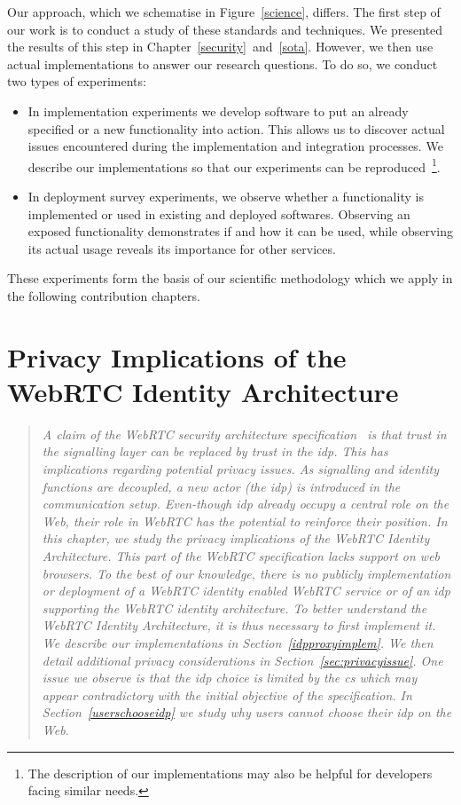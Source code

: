 Our approach, which we schematise in Figure~\ref{science}, differs.
The first step of our work is to conduct a study of these standards and techniques.
We presented the results of this step in Chapter~\ref{security}~and~\ref{sota}.
However, we then use actual implementations to answer our research questions. 
To do so, we conduct two types of experiments:
\begin{itemize}
\item In implementation experiments we develop software to put an already specified or a new functionality into action.
This allows us to discover actual issues encountered during the implementation and integration processes.
We describe our implementations so that our experiments can be reproduced~\footnote{The description of our implementations may also be helpful for developers facing similar needs.}.
\item In deployment survey experiments, we observe whether a functionality is implemented or used in existing and deployed softwares.
Observing an exposed functionality demonstrates if and how it can be used, while observing its actual usage reveals its importance for other services.
\end{itemize}

These experiments form the basis of our scientific methodology which we apply in the following contribution chapters.



\chapter{Privacy Implications of the WebRTC Identity Architecture}
\label{webrtcprivacy}
\begin{quote}
\textit{
A claim of the WebRTC security architecture specification~\cite{I-D.ietf-rtcweb-security-arch} is that trust in the signalling layer can be replaced by trust in the \gls{idp}.
This has implications regarding potential privacy issues.
As signalling and identity functions are decoupled, a new actor (the \gls{idp}) is introduced in the communication setup.
Even-though \gls{idp} already occupy a central role on the Web, their role in WebRTC has the potential to reinforce their position.
In this chapter, we study the privacy implications of the WebRTC Identity Architecture.
This part of the WebRTC specification lacks support on web browsers.
To the best of our knowledge, there is no publicly implementation or deployment of a WebRTC identity enabled WebRTC service or of an \gls{idp} supporting the WebRTC identity architecture.
To better understand the WebRTC Identity Architecture, it is thus necessary to first implement it.
We describe our implementations in Section~\ref{idpproxyimplem}.
We then detail additional privacy considerations in Section~\ref{sec:privacyissue}.
One issue we observe is that the \gls{idp} choice is limited by the \gls{cs} which may appear contradictory with the initial objective of the specification.
In Section~\ref{userschooseidp} we study why users cannot choose their \gls{idp} on the Web. 
}
\end{quote}

